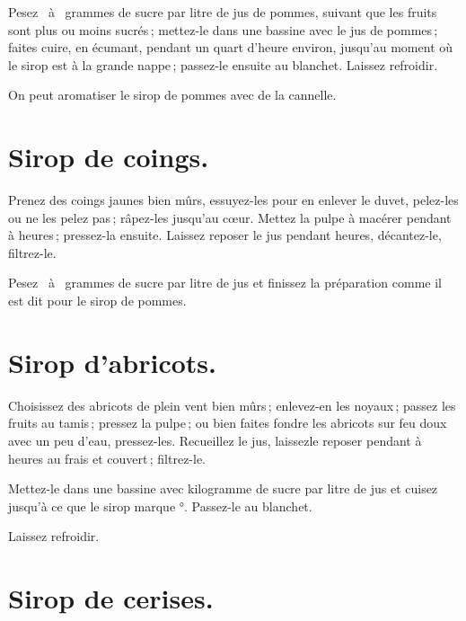 Pesez {\mmm} {\mmm} à {\mmm} {\mmm} grammes de sucre
par litre de jus de pommes, suivant que les fruits sont plus ou moins sucrés ;
mettez-le dans une bassine avec le jus de pommes ; faites cuire, en écumant,
pendant un quart d'heure environ, jusqu'au moment où le sirop est à la grande
nappe ; passez-le ensuite au blanchet. Laissez refroidir.

\medskip

On peut aromatiser le sirop de pommes avec de la cannelle.

\section*{\centering Sirop de coings.}
{}

Prenez des coings jaunes bien mûrs, essuyez-les pour en enlever le duvet,
pelez-les ou ne les pelez pas ; râpez-les jusqu'au cœur. Mettez la pulpe
à macérer pendant {\mmm} à {\mmm} heures ; pressez-la ensuite.
Laissez reposer le jus pendant {\mmm} heures, décantez-le, filtrez-le.

Pesez {\mmm} {\mmm} à {\mmm} {\mmm} grammes de sucre
par litre de jus et finissez la préparation comme il est dit pour le sirop de
pommes.

\section*{\centering Sirop d'abricots.}
{}

Choisissez des abricots de plein vent bien mûrs ; enlevez-en les noyaux ;
passez les fruits au tamis ; pressez la pulpe ; ou bien faites fondre les
abricots sur feu doux avec un peu d'eau, pressez-les. Recueillez le jus,
laissezle reposer pendant {\mmm} à {\mmm} heures au frais et
couvert ; filtrez-le.

Mettez-le dans une bassine avec {\mmm} kilogramme de sucre par litre de
jus et cuisez jusqu'à ce que le sirop marque {\mmm}°. Passez-le au blanchet.

Laissez refroidir.

\section*{\centering Sirop de cerises.}
{}

